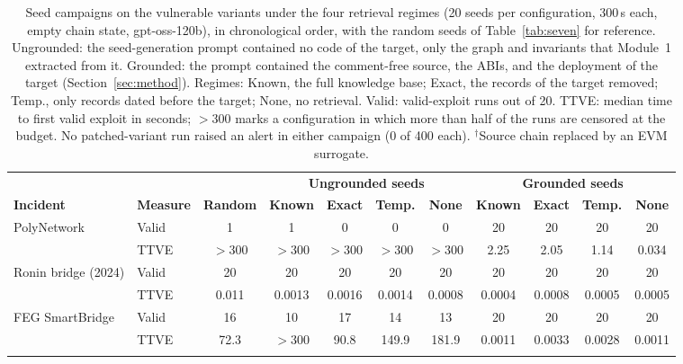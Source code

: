 \documentclass[a4paper]{cas-sc}
\newcommand{\hd}[1]{{\bfseries\boldmath #1}}
\begin{document}
\begin{table}[pos=t,belowcap=4pt]
\centering
\caption{Seed campaigns on the vulnerable variants under the four retrieval regimes (20 seeds per configuration, 300\,s each, empty chain state, gpt-oss-120b), in chronological order, with the random seeds of Table~\ref{tab:seven} for reference. Ungrounded: the seed-generation prompt contained no code of the target, only the graph and invariants that Module~1 extracted from it. Grounded: the prompt contained the comment-free source, the ABIs, and the deployment of the target (Section~\ref{sec:method}). Regimes: Known, the full knowledge base; Exact, the records of the target removed; Temp., only records dated before the target; None, no retrieval. Valid: valid-exploit runs out of 20. TTVE: median time to first valid exploit in seconds; $>$300 marks a configuration in which more than half of the runs are censored at the budget. No patched-variant run raised an alert in either campaign (0 of 400 each). $^{\dagger}$Source chain replaced by an EVM surrogate.}
\label{tab:seeds}
\footnotesize
\setlength{\tabcolsep}{4pt}
\begin{tabular*}{\textwidth}{@{\extracolsep{\fill}}llccccccccc@{}}
\toprule
 & & & \multicolumn{4}{c}{\hd{Ungrounded seeds}} & \multicolumn{4}{c}{\hd{Grounded seeds}} \\
\cmidrule(lr){4-7}\cmidrule(l){8-11}
\hd{Incident} & \hd{Measure} & \hd{Random} & \hd{Known} & \hd{Exact} & \hd{Temp.} & \hd{None} & \hd{Known} & \hd{Exact} & \hd{Temp.} & \hd{None} \\
\midrule
PolyNetwork                 & Valid & 1      & 1      & 0      & 0      & 0      & 20     & 20     & 20     & 20     \\
                            & TTVE  & $>$300 & $>$300 & $>$300 & $>$300 & $>$300 & 2.25   & 2.05   & 1.14   & 0.034  \\
\addlinespace[2pt]
Ronin bridge (2024)         & Valid & 20     & 20     & 20     & 20     & 20     & 20     & 20     & 20     & 20     \\
                            & TTVE  & 0.011  & 0.0013 & 0.0016 & 0.0014 & 0.0008 & 0.0004 & 0.0008 & 0.0005 & 0.0005 \\
\addlinespace[2pt]
FEG SmartBridge             & Valid & 16     & 10     & 17     & 14     & 13     & 20     & 20     & 20     & 20     \\
                            & TTVE  & 72.3   & $>$300 & 90.8   & 149.9  & 181.9  & 0.0011 & 0.0033 & 0.0028 & 0.0011 \\
\addlinespace[2pt]

\end{tabular*}
\end{table}
\end{document}
